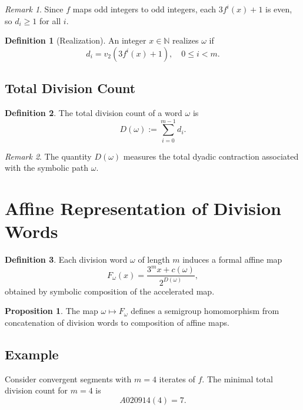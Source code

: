 \documentclass[12pt, oneside]{article}
\numberwithin{equation}{section}
\theoremstyle{definition}
\newtheorem{definition}{Definition}[section]
\newtheorem{proposition}{Proposition}[section]
\theoremstyle{plain}
\theoremstyle{remark}
\newtheorem*{remark}{Remark}
\begin{document}
\begin{remark}
Since $f$ maps odd integers to odd integers, each $3f^i(x)+1$ is even,
so $d_i \ge 1$ for all $i$.
\end{remark}

\begin{definition}[Realization]
An integer $x \in \mathbb{N}$ realizes $\omega$ if
\[
d_i = v_2(3f^i(x)+1), \quad 0 \le i < m.
\]
\end{definition}

\subsection{Total Division Count}

\begin{definition}
The total division count of a word $\omega$ is
\[
D(\omega) := \sum_{i=0}^{m-1} d_i.
\]
\end{definition}

\begin{remark}
The quantity $D(\omega)$ measures the total dyadic contraction
associated with the symbolic path $\omega$.
\end{remark}

\section{Affine Representation of Division Words}
\label{sec:affine-representation}

\begin{definition}
Each division word $\omega$ of length $m$ induces a formal affine map
\[
F_\omega(x) = \frac{3^m x + c(\omega)}{2^{D(\omega)}},
\]
obtained by symbolic composition of the accelerated map.
\end{definition}

\begin{proposition}
The map $\omega \mapsto F_\omega$ defines a semigroup homomorphism
from concatenation of division words to composition of affine maps.
\end{proposition}

\subsection{Example}

Consider convergent segments with $m=4$ iterates of $f$.  
The minimal total division count for $m=4$ is
\[
A020914(4) = 7.
\]
\end{document}
